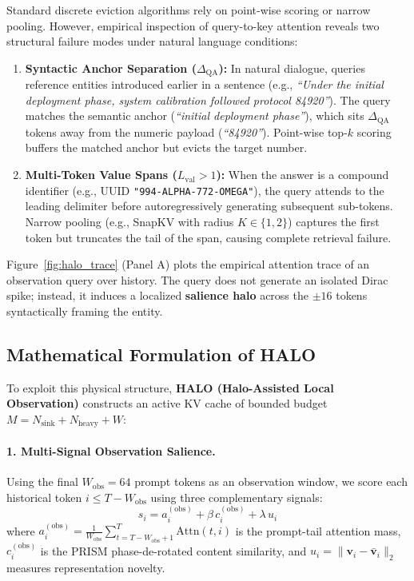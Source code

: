 \documentclass[11pt,a4paper]{article}
\begin{document}
Standard discrete eviction algorithms rely on point-wise scoring or narrow pooling. However, empirical inspection of query-to-key attention reveals two structural failure modes under natural language conditions:
\begin{enumerate}[leftmargin=*]
    \item \textbf{Syntactic Anchor Separation ($\Delta_{\text{QA}}$):} In natural dialogue, queries reference entities introduced earlier in a sentence (e.g., \textit{``Under the initial deployment phase, system calibration followed protocol 84920''}). The query matches the semantic anchor (\textit{``initial deployment phase''}), which sits $\Delta_{\text{QA}}$ tokens away from the numeric payload (\textit{``84920''}). Point-wise top-$k$ scoring buffers the matched anchor but evicts the target number.
    \item \textbf{Multi-Token Value Spans ($L_{\text{val}} > 1$):} When the answer is a compound identifier (e.g., UUID \texttt{"994-ALPHA-772-OMEGA"}), the query attends to the leading delimiter before autoregressively generating subsequent sub-tokens. Narrow pooling (e.g., SnapKV with radius $K \in \{1, 2\}$) captures the first token but truncates the tail of the span, causing complete retrieval failure.
\end{enumerate}

Figure~\ref{fig:halo_trace} (Panel A) plots the empirical attention trace of an observation query over history. The query does not generate an isolated Dirac spike; instead, it induces a localized \textbf{salience halo} across the $\pm 16$ tokens syntactically framing the entity.

\subsection{Mathematical Formulation of HALO}
\label{sec:halo_formulation}

To exploit this physical structure, \textbf{HALO (Halo-Assisted Local Observation)} constructs an active KV cache of bounded budget $M = N_{\text{sink}} + N_{\text{heavy}} + W$:

\paragraph{1. Multi-Signal Observation Salience.}
Using the final $W_{\text{obs}} = 64$ prompt tokens as an observation window, we score each historical token $i \le T - W_{\text{obs}}$ using three complementary signals:
\begin{equation}
\label{eq:salience_metric}
s_i = a_i^{(\text{obs})} + \beta \, c_i^{(\text{obs})} + \lambda \, u_i
\end{equation}
where $a_i^{(\text{obs})} = \frac{1}{W_{\text{obs}}} \sum_{t=T-W_{\text{obs}}+1}^T \text{Attn}(t, i)$ is the prompt-tail attention mass, $c_i^{(\text{obs})}$ is the PRISM phase-de-rotated content similarity, and $u_i = \|\mathbf{v}_i - \bar{\mathbf{v}}_i\|_2$ measures representation novelty.
\end{document}
